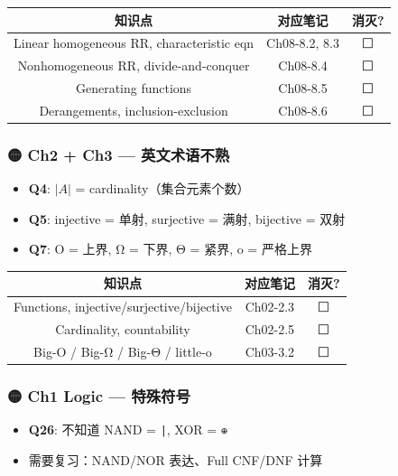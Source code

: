\documentclass[10pt,a4paper,openany]{ctexbook}
\theoremstyle{definition}
\theoremstyle{remark}
\begin{document}
\begin{center}
\begin{tabular}{ccc}
\hline
知识点 & 对应笔记 & 消灭? \\ \hline
Linear homogeneous RR, characteristic eqn & Ch08-8.2, 8.3 & ⬜ \\
Nonhomogeneous RR, divide-and-conquer & Ch08-8.4 & ⬜ \\
Generating functions & Ch08-8.5 & ⬜ \\
Derangements, inclusion-exclusion & Ch08-8.6 & ⬜ \\
\hline
\end{tabular}

\end{center}

\subsubsection{🟡 Ch2 + Ch3 — 英文术语不熟}

\begin{itemize}
\item \textbf{Q4}: $|A|$ = cardinality（集合元素个数）
\item \textbf{Q5}: injective = 单射, surjective = 满射, bijective = 双射
\item \textbf{Q7}: O = 上界, Ω = 下界, Θ = 紧界, o = 严格上界

\end{itemize}

\begin{center}
\begin{tabular}{ccc}
\hline
知识点 & 对应笔记 & 消灭? \\ \hline
Functions, injective/surjective/bijective & Ch02-2.3 & ⬜ \\
Cardinality, countability & Ch02-2.5 & ⬜ \\
Big-O / Big-Ω / Big-Θ / little-o & Ch03-3.2 & ⬜ \\
\hline
\end{tabular}

\end{center}

\subsubsection{🟡 Ch1 Logic — 特殊符号}

\begin{itemize}
\item \textbf{Q26}: 不知道 NAND = \texttt{|}, XOR = \texttt{⊕}
\item 需要复习：NAND/NOR 表达、Full CNF/DNF 计算

\end{itemize}
\end{document}
